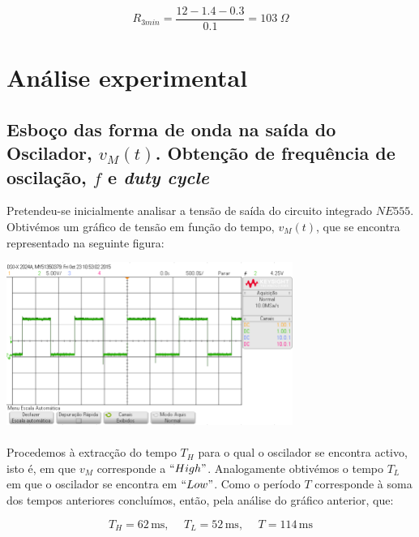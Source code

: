 \documentclass[a4paper,11pt]{report}
\begin{document}
\begin{equation}
R_{3min}=\frac{12-1.4-0.3}{0.1}=103\hspace{3pt}\Omega
\end{equation}

\section{Análise experimental}

\subsection{Esboço das forma de onda na saída do Oscilador, $v_M(t)$. Obtenção de frequência de oscilação, $f$  e \textit{duty cycle}}
Pretendeu-se inicialmente analisar a tensão de saída do circuito integrado $NE555$. Obtivémos um gráfico de tensão em função do tempo, $v_M(t)$, que se encontra representado na seguinte figura:

\begin{center}
    \includegraphics[angle=0,width=0.7\textwidth]{VM.png}
    \label{fig:VM}
    \end{center}
    
\paragraph{}Procedemos à extracção do tempo $T_H$ para o qual o oscilador se encontra activo, isto é, em que $v_M$ corresponde a $``High"$. Analogamente obtivémos o tempo $T_L$ em que o oscilador se encontra em $``Low"$. Como o período $T$ corresponde à soma dos tempos anteriores concluímos, então, pela análise do gráfico anterior, que:

$$T_H=62\,\textrm{ms}, \hspace{15pt} T_L=52\,\textrm{ms},\hspace{15pt}T=114\,\textrm{ms}$$
\end{document}
